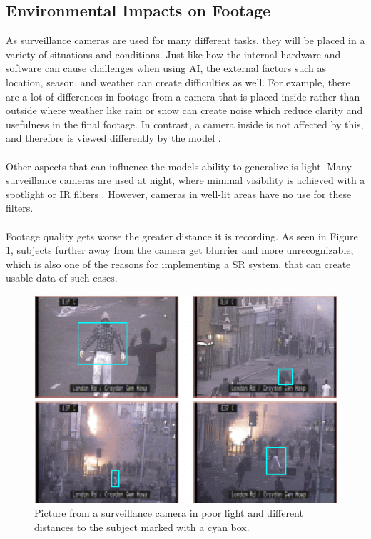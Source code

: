 \subsection{Environmental Impacts on Footage}
As surveillance cameras are used for many different tasks, they will be placed in a variety of situations and conditions. Just like how the internal hardware and software can cause challenges when using \acs{AI}, the external factors such as location, season, and weather can create difficulties as well. For example, there are a lot of differences in footage from a camera that is placed inside rather than outside where weather like rain or snow can create noise which reduce clarity and usefulness in the final footage. In contrast, a camera inside is not affected by this, and therefore is viewed differently by the model \cite{arxiv_superres2021}. 
\\\\
Other aspects that can influence the models ability to generalize is light. Many surveillance cameras are used at night, where minimal visibility is achieved with a spotlight or \acf{IR} filters \cite{nightvision_enhancement2018}. However, cameras in well-lit areas have no use for these filters.
\\\\
Footage quality gets worse the greater distance it is recording. As seen in Figure \ref{fig:camera_distance}, subjects further away from the camera get blurrier and more unrecognizable, which is also one of the reasons for implementing a \acs{SR} system, that can create usable data of such cases. 
\begin{figure}[H]
    \centering
    \includegraphics[width=0.7\linewidth]{figures/images/Typical-images-from-a-single-CCTV-camera-with-poor-lighting-and-long-range-camera-views.png}
    \caption{Picture from a surveillance camera in poor light and different distances to the subject marked with a cyan box.}
    \label{fig:camera_distance}
\end{figure}


